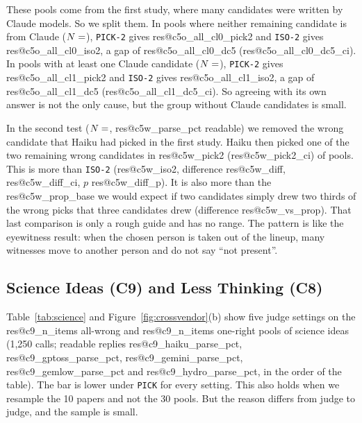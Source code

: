 \documentclass[10pt,twocolumn]{article}
\makeatletter
\newcommand{\res}[1]{\csname res@#1\endcsname}
\makeatother
\begin{document}
These pools come from the first study, where many candidates were written by Claude models. So we split them. In pools where neither remaining candidate is from Claude ($N=\res{c5o_all_cl0_n}$), \texttt{PICK-2} gives \res{c5o_all_cl0_pick2} and \texttt{ISO-2} gives \res{c5o_all_cl0_iso2}, a gap of \res{c5o_all_cl0_dc5} (\res{c5o_all_cl0_dc5_ci}). In pools with at least one Claude candidate ($N=\res{c5o_all_cl1_n}$), \texttt{PICK-2} gives \res{c5o_all_cl1_pick2} and \texttt{ISO-2} gives \res{c5o_all_cl1_iso2}, a gap of \res{c5o_all_cl1_dc5} (\res{c5o_all_cl1_dc5_ci}). So agreeing with its own answer is not the only cause, but the group without Claude candidates is small.

In the second test ($N=\res{c5w_n}$, \res{c5w_parse_pct} readable) we removed the wrong candidate that Haiku had picked in the first study. Haiku then picked one of the two remaining wrong candidates in \res{c5w_pick2} (\res{c5w_pick2_ci}) of pools. This is more than \texttt{ISO-2} (\res{c5w_iso2}, difference \res{c5w_diff}, \res{c5w_diff_ci}, $p$ \res{c5w_diff_p}). It is also more than the \res{c5w_prop_base} we would expect if two candidates simply drew two thirds of the wrong picks that three candidates drew (difference \res{c5w_vs_prop}). That last comparison is only a rough guide and has no range. The pattern is like the eyewitness result: when the chosen person is taken out of the lineup, many witnesses move to another person and do not say ``not present''.

\subsection{Science Ideas (C9) and Less Thinking (C8)}
Table~\ref{tab:science} and Figure~\ref{fig:crossvendor}(b) show five judge settings on the \res{c9_n_items} all-wrong and \res{c9_n_items} one-right pools of science ideas (1,250 calls; readable replies \res{c9_haiku_parse_pct}, \res{c9_gptoss_parse_pct}, \res{c9_gemini_parse_pct}, \res{c9_gemlow_parse_pct} and \res{c9_hydro_parse_pct}, in the order of the table). The bar is lower under \texttt{PICK} for every setting. This also holds when we resample the 10 papers and not the 30 pools. But the reason differs from judge to judge, and the sample is small.
\end{document}
